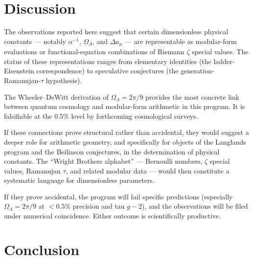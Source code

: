 \documentclass[11pt,a4paper]{article}
\begin{document}
\section{Discussion}

The observations reported here suggest that certain dimensionless
physical constants --- notably $\alpha^{-1}$, $\Omega_\Lambda$, and
$\Delta a_\mu$ --- are representable as modular-form evaluations or
functional-equation combinations of Riemann $\zeta$ special values.
The status of these representations ranges from elementary
identities (the ladder-Eisenstein correspondence) to speculative
conjectures (the generation-Ramanujan-$\tau$ hypothesis).

The Wheeler--DeWitt derivation of $\Omega_\Lambda = 2\pi/9$ provides
the most concrete link between quantum cosmology and modular-form
arithmetic in this program. It is falsifiable at the $0.5\%$ level
by forthcoming cosmological surveys.

If these connections prove structural rather than accidental, they
would suggest a deeper role for arithmetic geometry, and specifically
for objects of the Langlands program and the Beilinson conjectures,
in the determination of physical constants. The ``Wright Brothers
alphabet'' --- Bernoulli numbers, $\zeta$ special values, Ramanujan
$\tau$, and related modular data --- would then constitute a
systematic language for dimensionless parameters.

If they prove accidental, the program will fail specific predictions
(especially $\Omega_\Lambda = 2\pi/9$ at $< 0.5\%$ precision and tau
$g-2$), and the observations will be filed under numerical
coincidence. Either outcome is scientifically productive.

\section{Conclusion}
\end{document}
